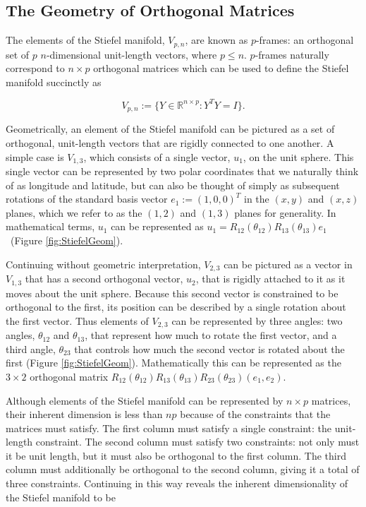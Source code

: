 \documentclass[ba]{imsart}
\numberwithin{equation}{section}
\theoremstyle{plain}
\begin{document}
\subsection{The Geometry of Orthogonal Matrices}\label{givens_stiefel_geometry}
The elements of the Stiefel manifold, $V_{p,n}$,  are known as $p$-frames: an orthogonal set of $p$ $n$-dimensional unit-length vectors, where $p \le n$. $p$-frames naturally correspond to $n \times p$ orthogonal matrices which can be used to define the Stiefel manifold succinctly as

\begin{equation}
V_{p,n} := \{Y \in \mathbb{R}^{n \times p}: Y^TY = I \}.
\end{equation}

\noindent Geometrically, an element of the Stiefel manifold can be pictured as a set of orthogonal, unit-length vectors that are rigidly connected to one another. A simple case is $V_{1,3}$, which consists of a single vector, $u_1$, on the unit sphere. This single vector can be represented by two polar coordinates that we naturally think of as longitude and latitude, but can also be thought of simply as subsequent rotations of the standard basis vector $e_1 := (1,0,0)^T$ in the $(x,y)$ and $(x,z)$ planes, which we refer to as the $(1,2)$ and $(1,3)$ planes for generality. In mathematical terms, $u_1$ can be represented as $u_1 = R_{12}(\theta_{12}) R_{13}(\theta_{13}) e_1$~(Figure \ref{fig:StiefelGeom}). 

\noindent Continuing without geometric interpretation, $V_{2,3}$ can be pictured as a vector in $V_{1,3}$ that has a second orthogonal vector, $u_2$, that is rigidly attached to it as it moves about the unit sphere. Because this second vector is constrained to be orthogonal to the first, its position can be described by a single rotation about the first vector. Thus elements of $V_{2,3}$ can be represented by three angles: two angles, $\theta_{12}$ and $\theta_{13}$, that represent how much to rotate the first vector, and a third angle, $\theta_{23}$ that controls how much the second vector is rotated about the first (Figure \ref{fig:StiefelGeom}). Mathematically this can be represented as the $3 \times 2$ orthogonal matrix $R_{12}(\theta_{12}) R_{13}(\theta_{13}) R_{23}(\theta_{23}) (e_1, e_2)$.

\noindent Although elements of the Stiefel manifold can be represented by $n \times p$ matrices, their inherent dimension is less than $np$ because of the constraints that the matrices must satisfy. The first column must satisfy a single constraint: the unit-length constraint. The second column must satisfy two constraints: not only must it be unit length, but it must also be orthogonal to the first column. The third column must additionally be orthogonal to the second column, giving it a total of three constraints. Continuing in this way reveals the inherent dimensionality of the Stiefel manifold to be
\end{document}
